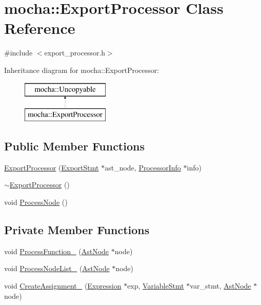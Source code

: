 \hypertarget{classmocha_1_1_export_processor}{
\section{mocha::ExportProcessor Class Reference}
\label{classmocha_1_1_export_processor}
}


{\ttfamily \#include $<$export\_\-processor.h$>$}

Inheritance diagram for mocha::ExportProcessor:\begin{figure}[H]
\begin{center}
\leavevmode
\includegraphics[height=2.000000cm]{classmocha_1_1_export_processor}
\end{center}
\end{figure}
\subsection*{Public Member Functions}
\begin{DoxyCompactItemize}
\item 
\hyperlink{classmocha_1_1_export_processor_a63f0edd9481e6fc4d8dde60b0ef88f0a}{ExportProcessor} (\hyperlink{classmocha_1_1_export_stmt}{ExportStmt} $\ast$ast\_\-node, \hyperlink{classmocha_1_1_processor_info}{ProcessorInfo} $\ast$info)
\item 
\hyperlink{classmocha_1_1_export_processor_ad80e808d141bb057fe9f5eadbf8fd4a7}{$\sim$ExportProcessor} ()
\item 
void \hyperlink{classmocha_1_1_export_processor_ae12e5be0a639fd259dec57f6f03f3ba5}{ProcessNode} ()
\end{DoxyCompactItemize}
\subsection*{Private Member Functions}
\begin{DoxyCompactItemize}
\item 
void \hyperlink{classmocha_1_1_export_processor_a17b1b0edb673c9a8b6022208d2651a5c}{ProcessFunction\_\-} (\hyperlink{classmocha_1_1_ast_node}{AstNode} $\ast$node)
\item 
void \hyperlink{classmocha_1_1_export_processor_a52633c14b8db9af8d066293723ac3565}{ProcessNodeList\_\-} (\hyperlink{classmocha_1_1_ast_node}{AstNode} $\ast$node)
\item 
void \hyperlink{classmocha_1_1_export_processor_a3561ecac21a33bb0e529f8eb9514b12f}{CreateAssignment\_\-} (\hyperlink{classmocha_1_1_expression}{Expression} $\ast$exp, \hyperlink{classmocha_1_1_variable_stmt}{VariableStmt} $\ast$var\_\-stmt, \hyperlink{classmocha_1_1_ast_node}{AstNode} $\ast$node)
\end{DoxyCompactItemize}
